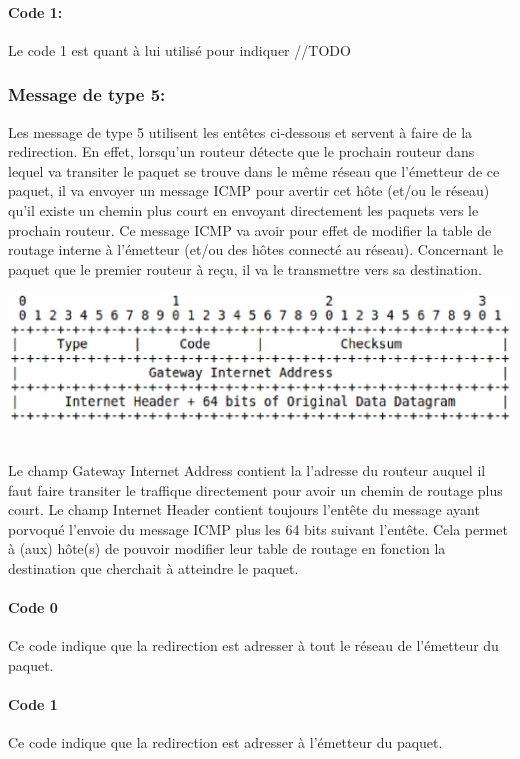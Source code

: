 \documentclass[twoside,openright,a4paper,11pt,french]{article}
\begin{document}
\paragraph{Code 1:}
Le code 1 est quant à lui utilisé pour indiquer //TODO


\subsubsection{Message de type 5:}
Les message de type 5 utilisent les entêtes ci-dessous et servent à faire de la redirection. En effet, lorsqu'un routeur détecte que le prochain routeur dans lequel va transiter le paquet se trouve dans le même réseau que l'émetteur de ce paquet, il va envoyer un message ICMP pour avertir cet hôte (et/ou le réseau) qu'il existe un chemin plus court en envoyant directement les paquets vers le prochain routeur. Ce message ICMP va avoir pour effet de modifier la table de routage interne à l'émetteur (et/ou des hôtes connecté au réseau). Concernant le paquet que le premier routeur à reçu, il va le transmettre vers sa destination.

\includegraphics[width=15cm]{./pics/header2.eps}

\\
Le champ Gateway Internet Address contient la l'adresse du routeur auquel il faut faire transiter le traffique directement pour avoir un chemin de routage plus court.
Le champ Internet Header contient toujours l'entête du message ayant porvoqué l'envoie du message ICMP plus les 64 bits suivant l'entête. Cela permet à (aux) hôte(s) de pouvoir modifier leur table de routage en fonction la destination que cherchait à atteindre le paquet.
\paragraph{Code 0}
Ce code indique que la redirection est adresser à tout le réseau de l'émetteur du paquet.
\paragraph{Code 1}
Ce code indique que la redirection est adresser à l'émetteur du paquet.
\end{document}
